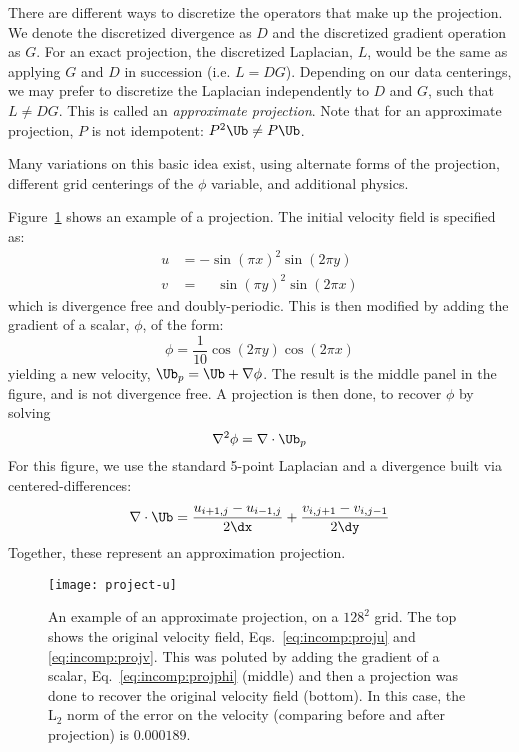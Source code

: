 There are different ways to discretize the operators that make up the
projection.  We denote the discretized divergence as $D$ and the
discretized gradient operation as $G$.  For an exact projection, the
discretized Laplacian, $L$, would be the same as applying $G$ and $D$
in succession (i.e. $L = DG$).  Depending on our data centerings, we
may prefer to discretize the Laplacian independently to $D$ and $G$,
such that $L \ne DG$.  This is called an {\em approximate projection}.
Note that for an approximate projection, $P$ is not
idempotent: $P^2 \Ub \ne P\Ub$.

Many variations on this basic idea exist, using alternate forms of the
projection, different grid centerings of the $\phi$ variable, and
additional physics.

Figure~\ref{fig:incomp:project} shows an example of a projection.  The
initial velocity field is specified as:
\begin{align}
\label{eq:incomp:proju}
  u &= -\sin(\pi x)^2 \sin(2\pi y) \\
\label{eq:incomp:projv}
  v &= \phantom{+} \sin(\pi y)^2 \sin(2\pi x)
\end{align}
which is divergence free and doubly-periodic.  This is then modified
by adding the gradient of a scalar, $\phi$, of the form:
\begin{equation}
\label{eq:incomp:projphi}
\phi = \frac{1}{10} \cos(2\pi y) \cos(2\pi x)
\end{equation}
yielding a new velocity, $\Ub_p = \Ub + \nabla \phi$.
The result is the middle panel in the figure, and is not divergence free.
A projection is then done, to recover $\phi$ by solving
\begin{equation}
\nabla^2 \phi = \nabla \cdot \Ub_p
\end{equation}
For this figure, we use the standard 5-point Laplacian and a divergence
built via centered-differences:
\begin{equation}
\nabla \cdot \Ub = \frac{u_{i+1,j} - u_{i-1,j}}{2\dx} + \frac{v_{i,j+1} - v_{i,j-1}}{2\dy}
\end{equation}
Together, these represent an approximation projection.

\begin{figure}[t]
\centering
\texttt{[image: project-u]}
\caption[Example of a projection]{\label{fig:incomp:project} An
  example of an approximate projection, on a $128^2$ grid.  The top
  shows the original velocity field, Eqs.~\ref{eq:incomp:proju} and
  \ref{eq:incomp:projv}.  This was poluted by adding the gradient of a
  scalar, Eq.~\ref{eq:incomp:projphi} (middle) and then a projection
  was done to recover the original velocity field (bottom).  In this
  case, the L$_2$ norm of the error on the velocity (comparing before
  and after projection) is $0.000189$. }
\end{figure}

